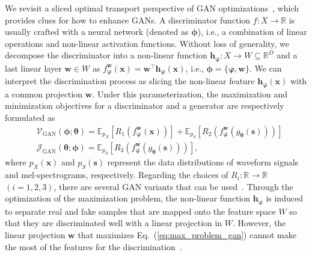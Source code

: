 \documentclass{article}
\def\beqref#1{(\ref{#1})}
\newcommand{\E}{\mathbb{E}}
\newcommand{\Js}{\mathcal{J}}
\begin{document}
We revisit a sliced optimal transport perspective of GAN optimizations~\cite{takida2023san}, which provides clues for how to enhance GANs.
A discriminator function $f:X\to\mathbb{R}$ is usually crafted with a neural network (denoted as $\bm{\phi}$), i.e., a combination of linear operations and non-linear activation functions.
Without loss of generality, we decompose the discriminator into a non-linear function $\bm{h}_{\bm{\varphi}}:X\to W\subseteq\mathbb{R}^D$ and a last linear layer $\bm{w}\in W$ as $f_{\bm{\varphi}}^{\bm{w}}(\bm{x})=\bm{w}^\top \bm{h}_{\bm{\varphi}}(\bm{x})$, i.e., $\bm{\phi}=\{\bm{\varphi},\bm{w}\}$. We can interpret the discrimination process as slicing the non-linear feature $\bm{h}_{\bm{\varphi}}(\bm{x})$ with a common projection $\bm{w}$. Under this parameterization, the maximization and minimization objectives for a discriminator and a generator are respectively formulated as 
\begin{align}
    &\mathcal{V}_{\text{GAN}}(\bm{\phi};\bm{\theta})
    =\E_{p_X}[R_1(f_{\bm{\varphi}}^{\bm{w}}(\bm{x}))]
    +\E_{p_S}[R_2(f_{\bm{\varphi}}^{\bm{w}}(g_{\bm{\theta}}(\bm{s})))]
    \label{eq:max_problem_gan}\\
    &\Js_{\text{GAN}}(\bm{\theta};\bm{\phi})
    =\E_{p_S}[R_3(f_{\bm{\varphi}}^{\bm{w}}(g_{\bm{\theta}}(\bm{s})))],
    \label{eq:min_problem_gan}
\end{align}
where $p_X(\bm{x})$ and $p_S(\bm{s})$ represent the data distributions of waveform signals and mel-spectrograms, respectively.
Regarding the choices of $R_i:\mathbb{R}\to\mathbb{R}$ $(i=1,2,3)$, there are several GAN variants that can be used~\cite{goodfellow2014generative,sebastian2016f,arjovsky2017wasserstein}.
Through the optimization of the maximization problem, the non-linear function $\bm{h}_{\bm{\varphi}}$ is induced to separate real and fake samples that are mapped onto the feature space $W$ so that they are discriminated well with a linear projection in $W$. However, the linear projection $\bm{w}$ that maximizes Eq.~\beqref{eq:max_problem_gan} cannot make the most of the features for the discrimination~\cite{takida2023san}.
\end{document}
